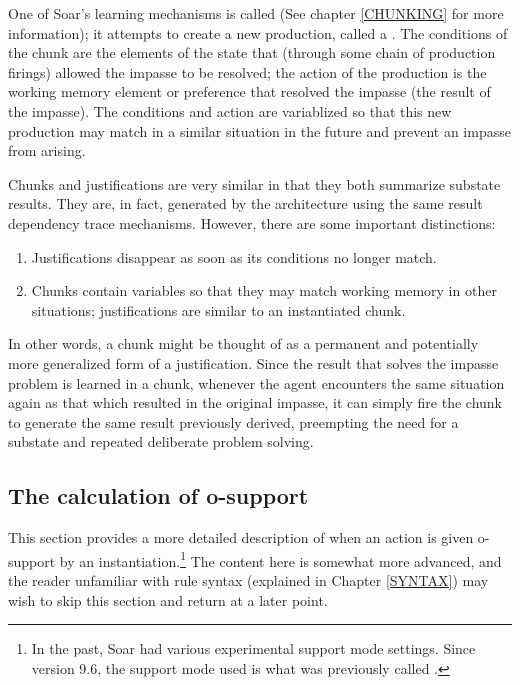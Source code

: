 One of Soar's learning mechanisms is called  (See chapter \ref{CHUNKING} for more information); it attempts to create a new production, called a . The conditions of the chunk are the elements of the state that (through some chain of production firings) allowed the impasse to be resolved; the action of the production is the working memory element or preference that resolved the impasse (the result of the impasse). The conditions and action are variablized so that this new production may match in a similar situation in the future and prevent an impasse from arising. 

Chunks and justifications are very similar in that they both summarize substate results. They are, in fact, generated by the architecture using the same result dependency trace mechanisms. However, there are some important distinctions:

\vspace{-12pt}
\begin{enumerate}
	\item Justifications disappear as soon as its conditions no longer match. 
	\vspace{-8pt}
	\item Chunks contain variables so that they may match working memory in other situations; justifications are similar to an instantiated chunk.
\end{enumerate}

In other words, a chunk might be thought of as a permanent and potentially more generalized form of a justification. Since the result that solves the impasse problem is learned in a chunk, whenever the agent encounters the same situation again as that which resulted in the original impasse, it can simply fire the chunk to generate the same result previously derived, preempting the need for a substate and repeated deliberate problem solving.


\subsection{The calculation of o-support}
\label{SUPPORT}

This section provides a more detailed description of when an action is given o-support by an instantiation.\footnote{
	In the past, Soar had various experimental support mode settings. Since version 9.6, the support mode used is what was previously called .} 
The content here is somewhat more advanced, and the reader unfamiliar with rule syntax (explained in Chapter \ref{SYNTAX}) may wish to skip this section and return at a later point.

